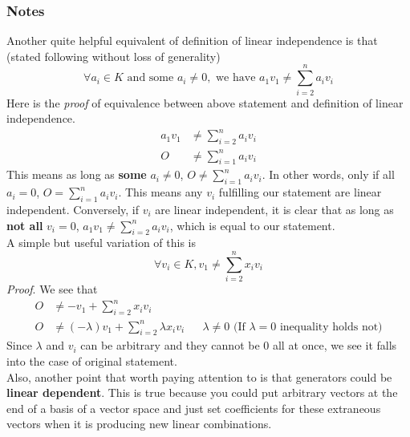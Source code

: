 \documentclass[11pt]{article}
\begin{document}
\subsubsection{Notes}
\label{sec:org9a59fd9}
\label{orgb6c34b8}
Another quite helpful equivalent of definition of linear independence is that (stated following without loss of generality)
$$\forall a_i\in K \text{ and some } a_i\not = 0, \text{ we have }a_1 v_1\not =\sum\limits_{i=2}^n a_iv_i$$
Here is the \emph{proof} of equivalence between above statement and definition of linear independence.\\
$$\begin{aligned}
a_1 v_1&\not =\sum\limits_{i=2}^n a_iv_i\\
O &\not = \sum\limits_{i=1}^n a_iv_i
\end{aligned}$$
This means as long as \textbf{some} \(a_i\not =0\), \(O \not = \sum\limits_{i=1}^n a_iv_i\). In other words, only if all \(a_i=0\), \(O = \sum\limits_{i=1}^n a_iv_i\). This means any \(v_i\) fulfilling our statement are linear independent. Conversely, if \(v_i\) are linear independent, it is clear that as long as \textbf{not all} \(v_i=0\), \(a_1 v_1\not =\sum\limits_{i=2}^n a_iv_i\), which is equal to our statement.\\
A simple but useful variation of this is
$$\forall v_i\in K, v_1\not = \sum\limits_{i=2}^n x_iv_i$$
\emph{Proof}. We see that
$$\begin{aligned}
O&\not = -v_1+\sum\limits_{i=2}^n x_iv_i\\
O&\not = (-\lambda)v_1+\sum\limits_{i=2}^n \lambda x_iv_i && \lambda\not = 0\text{ (If } \lambda=0 \text{ inequality holds not)}
\end{aligned}$$
Since \(\lambda\) and \(v_i\) can be arbitrary and they cannot be \(0\) all at once, we see it falls into the case of original statement.\\
Also, another point that worth paying attention to is that generators could be \textbf{linear dependent}. This is true because you could put arbitrary vectors at the end of a basis of a vector space and just set coefficients for these extraneous vectors when it is producing new linear combinations.
\end{document}
